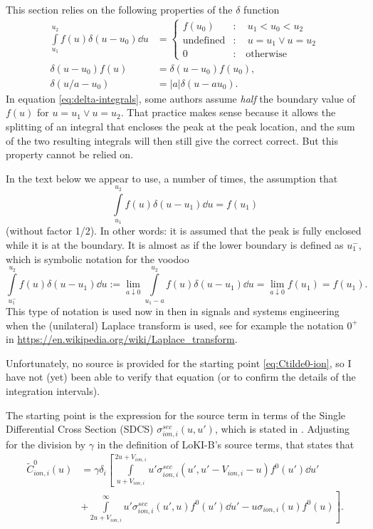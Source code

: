 \documentclass{book}
\begin{document}
This section relies on the following properties of the $\delta$ function
\begin{align}
	\int\limits_{u_1}^{u_2} f(u)\delta(u-u_0)\dd{u} &= \begin{cases}
		f(u_0)	&:\quad u_1<u_0<u_2 \\
			\text{undefined}	&:\quad u=u_1 \vee u=u_2 \\
		0	&:\quad \text{otherwise}
	\end{cases} \label{eq:delta-integrals}
	\\
	\delta(u-u_0)f(u) &=\delta(u-u_0)f(u_0), \label{eq:del(u-u0)f(u)=del(u-u0)f(u0)}
	\\
	\delta(u/a-u_0) &=|a|\delta(u-au_0). \label{eq:delta-scaling}
\end{align}
In equation \eqref{eq:delta-integrals}, some authors assume {\em half} the boundary
value of $f(u)$ for $u=u_1 \vee u=u_2$. That practice makes sense because
it allows the splitting of an integral that encloses the peak at the peak
location, and the sum of the two resulting integrals will then still give the
correct correct. But this property cannot be relied on.
\begin{framed}
	In the text below we appear to use, a number of times, the assumption that
	\[
		\int\limits_{u_1}^{u_2} f(u)\delta(u-u_1)\dd{u} = f(u_1)
	\]
	(without factor 1/2). In other words: it is assumed that the peak is fully
	enclosed while it is at the boundary. It is almost as if the lower
	boundary is defined as $u_1^-$, which is symbolic notation for the voodoo
	\[
		\int\limits_{u_1^-}^{u_2} f(u)\delta(u-u_1)\dd{u}
		:=
		\lim_{a\downarrow 0}\int\limits_{u_1-a}^{u_2} f(u)\delta(u-u_1)\dd{u}
		=
		\lim_{a\downarrow 0}f(u_1)
		=
		f(u_1).
	\]
	This type of notation is used now in then in signals and systems engineering
	when the (unilateral) Laplace transform is used, see for example the notation
	$0^+$ in \url{https://en.wikipedia.org/wiki/Laplace_transform}.

	Unfortunately, no source is provided for the starting point
	\eqref{eq:Ctilde0-ion}, so I have not (yet) been able to verify
	that equation (or to confirm the details of the integration intervals).
\end{framed}

The starting point is the expression for the source term in terms of the
Single Differential Cross Section (SDCS) $\sigma_{ion,i}^{sec}(u,u')$, which is
stated in \cite[eq. 13b]{Manual_2_2_0}.
Adjusting for the division by $\gamma$ in the definition of LoKI-B's source
terms, that states that
\begin{align}
	\tilde{C}^0_{ion,i}(u)
	&=\gamma\delta_i\left[
		\int\limits_{u+V_{ion,i}}^{2u+V_{ion,i}}u'\sigma_{ion,i}^{sec}(u',u'-V_{ion,i}-u)f^0(u')\dd{u'}
		\right.
	\nonumber \\
		&+ \left.
		\int\limits_{2u+V_{ion,i}}^{\infty}u'\sigma_{ion,i}^{sec}(u',u)f^0(u')\dd{u'}
		-
		u\sigma_{ion,i}(u)f^0(u)
	\right].
	\label{eq:Ctilde0-ion}
\end{align}
\end{document}
